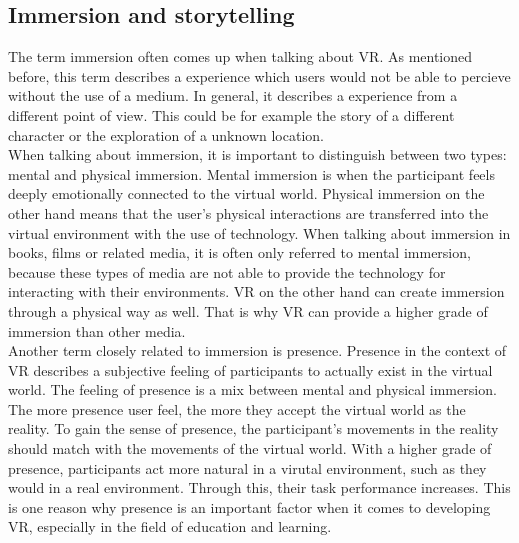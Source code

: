 \subsection{Immersion and storytelling}
The term immersion often comes up when talking about VR. As mentioned before, this term describes a experience which users would not be able to percieve without the use of a medium. In general, it describes a experience from a different point of view. This could be for example the story of a different character or the exploration of a unknown location. \cite{Tham.2018} \\
When talking about immersion, it is important to distinguish between two types: mental and physical immersion. Mental immersion is when the participant feels deeply emotionally connected to the virtual world. Physical immersion on the other hand means that the user's physical interactions are transferred into the virtual environment with the use of technology. When talking about immersion in books, films or related media, it is often only referred to mental immersion, because these types of media are not able to provide the technology for interacting with their environments. VR on the other hand can create immersion through a physical way as well. That is why VR can provide a higher grade of immersion than other media. \cite{Tham.2018}\\
Another term closely related to immersion is presence. Presence in the context of VR describes a subjective feeling of participants to actually exist in the virtual world. The feeling of presence is a mix between mental and physical immersion. The more presence user feel, the more they accept the virtual world as the reality. To gain the sense of presence, the participant's movements in the reality should match with the movements of the virtual world. With a higher grade of presence, participants act more natural in a virutal environment, such as they would in a real environment. Through this, their task performance increases. This is one reason why presence is an important factor when it comes to developing VR, especially in the field of education and learning. \cite{Slater.1997}\\

